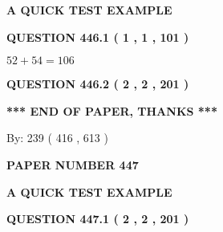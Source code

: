 \documentclass[12pt]{article}
\begin{document}
   
\vspace{0.2in}
   
   
   
   
   
   
 \vspace{0.2in}
{\LARGE {\textbf{ A QUICK TEST EXAMPLE}}}
   
   
  
\vspace{0.2in}
  
{\textbf{\Large{QUESTION
446.1 
 ( 1 , 1 , 101 )
}}}
  
  
 
 

$ %
52 +  %
54=   %
106$
 
 
  
\vspace{0.2in}
  
{\textbf{\Large{QUESTION
446.2 
 ( 2 , 2 , 201 )
}}}
  
  
   
   
 \vspace{0.2in}
 
   
   
   
   
\vspace{1.0in} 
{\textbf{\large{ *** END OF PAPER, THANKS *** }}} 
   
   
\hspace{1.0in} By: 
 239 ( 416 ,  613 )
   
   
   
   
\newpage 
\setcounter{page}{ 
   447001 } 
   
   
   
   
 {\textbf{ \Large{ PAPER NUMBER  447  }}}
   
   
\vspace{0.2in}
   
   
   
   
   
   
 \vspace{0.2in}
{\LARGE {\textbf{ A QUICK TEST EXAMPLE}}}
   
   
  
\vspace{0.2in}
  
{\textbf{\Large{QUESTION
447.1 
 ( 2 , 2 , 201 )
}}}
  
\end{document}
